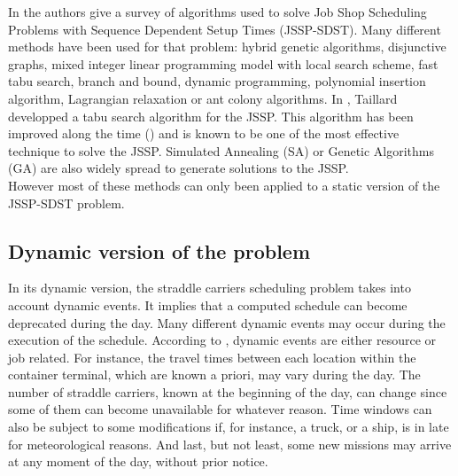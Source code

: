 \documentclass[a4paper,10pt]{article}
\begin{document}
In \cite{Allahverdi2008} the authors give a survey of algorithms used to solve Job Shop Scheduling Problems with Sequence Dependent Setup Times (JSSP-SDST). Many different methods have been used for that problem: hybrid genetic algorithms, disjunctive graphs, mixed integer linear programming model with local search scheme, fast tabu search, branch and bound, dynamic programming, polynomial insertion algorithm, Lagrangian relaxation or ant colony algorithms. In \cite{Taillard1994}, Taillard developped a tabu search algorithm for the JSSP. This algorithm has been improved along the time (\cite{Blazewicz1996, Watson2003}) and is known to be one of the most effective technique to solve the JSSP. Simulated Annealing (SA) or Genetic Algorithms (GA) are also widely spread to generate solutions to the JSSP.\\%

However most of these methods can only been applied to a static version of the JSSP-SDST problem.

\subsection{Dynamic version of the problem}\label{subsec:dynamic}

In its dynamic version, the straddle carriers scheduling problem takes into account dynamic events. It implies that a computed schedule can become deprecated during the day. Many different dynamic events may occur during the execution of the schedule. According to \cite{Ouelhadj2009}, dynamic events are either resource or job related. For instance, the travel times between each location within the container terminal, which are known a priori, may vary during the day. The number of straddle carriers, known at the beginning of the day, can change since some of them can become unavailable for whatever reason. Time windows can also be subject to some modifications if, for instance, a truck, or a ship, is in late for meteorological reasons. And last, but not least, some new missions may arrive at any moment of the day, without prior notice.\\
\end{document}
